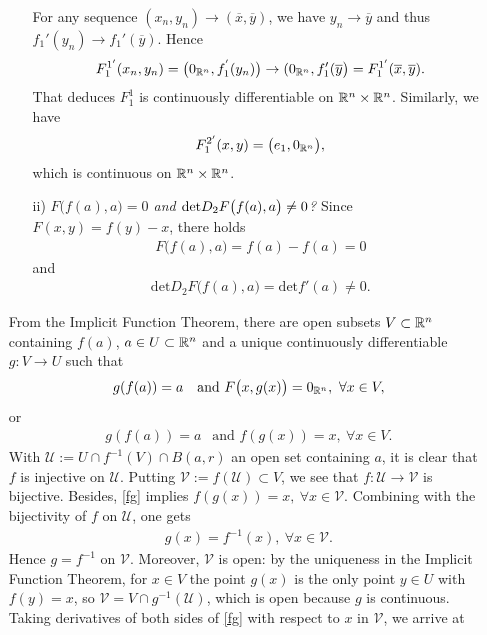 \begin{problem}
\begin{solution}
\begin{enumerate}
\begin{enumerate}
        For any sequence $(x_n,y_n) \rightarrow (\overline{x},\overline{y})$, we have $y_n \rightarrow \overline{y}$ and thus $f_1' (y_n) \rightarrow f_1' (\overline{y})$. Hence 
        \begin{align*}
            F^{1'}_{1}  (x_n,y_n) = \big(0_{\R^n},f_1^{'} (y_n)\big) \rightarrow (0_{\R^n}, f_1' (\overline{y}\big) = F_1^{1'}  (\overline{x}, \overline{y}).
        \end{align*}
        That deduces $F^1_1$ is continuously differentiable on $\R^n \times \R^n$. Similarly, we have 
        \begin{align*}
            F_1^{2'} (x,y) = \big( e_1 , 0_{\R^n} \big),
        \end{align*}
        which is continuous on $\R^n \times \R^n$.
        \item[ii)] \textit{$F\big( f(a),a \big) =0$ and $\mathrm{\textup{det}}D_2 F\big( f(a),a \big) \ne 0$?} Since $F(x,y) =f(y)-x$, there holds
        \begin{align*}
            F\big( f(a),a \big) = f(a) - f(a) =0
        \end{align*}
        and 
        \begin{align*}
            \mathrm{det}D_2 F\big( f(a),a \big) = \mathrm{det}f'(a) \ne 0.
        \end{align*}
    \end{enumerate}
    From the Implicit Function Theorem, there are open subsets $V\subset \mathbb{R}^n$ containing $f(a)$, $a\in U\subset\mathbb{R}^n$ and a unique continuously differentiable $g:V\rightarrow U$ such that 
    \begin{align*}
        g(f(a))=a \ \ \text{ and } F\big(x, g(x)\big) =0_{\R^n},\ \forall x\in V,
    \end{align*}
    or 
    \begin{align}\label{fg}
         g(f(a))=a \ \ \text{ and } f(g(x))=x,\ \forall x\in V.
    \end{align}
    With $\mathcal{U}:=U\cap f^{-1}(V) \cap B(a,r)$ an open set containing $a$, it is clear that $f$ is injective on $\mathcal{U}$. Putting $\mathcal{V}:= f(\mathcal{U})\subset V$, we see that $f:\mathcal{U}\rightarrow\mathcal{V}$ is bijective. Besides, \eqref{fg} implies $f(g(x)) = x,\ \forall x\in \mathcal{V}$. Combining with the bijectivity of $f$ on $\mathcal{U}$, one gets
    \begin{align*}
        g(x) = f^{-1}(x),\ \forall x\in \mathcal{V}.
    \end{align*}
    Hence $g=f^{-1}$ on $\mathcal{V}$. Moreover, $\mathcal{V}$ is open: by the uniqueness in the Implicit Function Theorem, for $x\in V$ the point $g(x)$ is the only point $y\in U$ with $f(y)=x$, so $\mathcal{V}=V\cap g^{-1}(\mathcal{U})$, which is open because $g$ is continuous. Taking derivatives of both sides of \eqref{fg} with respect to $x$ in $\mathcal{V}$, we arrive at

\end{enumerate}
\end{solution}
\end{problem}
